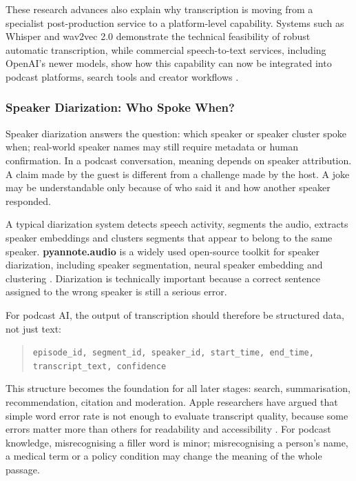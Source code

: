 \documentclass[11pt,a4paper]{article}
\begin{document}
These research advances also explain why transcription is moving from a specialist post-production service to a platform-level capability. Systems such as Whisper and wav2vec 2.0 demonstrate the technical feasibility of robust automatic transcription, while commercial speech-to-text services, including OpenAI's newer models, show how this capability can now be integrated into podcast platforms, search tools and creator workflows \cite{OpenAI2026STT}.


\subsubsection{Speaker Diarization: Who Spoke When?}

Speaker diarization answers the question: which speaker or speaker cluster spoke when; real-world speaker names may still require metadata or human confirmation. In a podcast conversation, meaning depends on speaker attribution. A claim made by the guest is different from a challenge made by the host. A joke may be understandable only because of who said it and how another speaker responded.

A typical diarization system detects speech activity, segments the audio, extracts speaker embeddings and clusters segments that appear to belong to the same speaker. \textbf{pyannote.audio} is a widely used open-source toolkit for speaker diarization, including speaker segmentation, neural speaker embedding and clustering \cite{Bredin2023pyannote}. Diarization is technically important because a correct sentence assigned to the wrong speaker is still a serious error.

For podcast AI, the output of transcription should therefore be structured data, not just text:

\begin{quote}
\texttt{episode\_id, segment\_id, speaker\_id, start\_time, end\_time, transcript\_text, confidence}
\end{quote}

This structure becomes the foundation for all later stages: search, summarisation, recommendation, citation and moderation. Apple researchers have argued that simple word error rate is not enough to evaluate transcript quality, because some errors matter more than others for readability and accessibility \cite{Apple2024HEWER}. For podcast knowledge, misrecognising a filler word is minor; misrecognising a person's name, a medical term or a policy condition may change the meaning of the whole passage.
\end{document}
